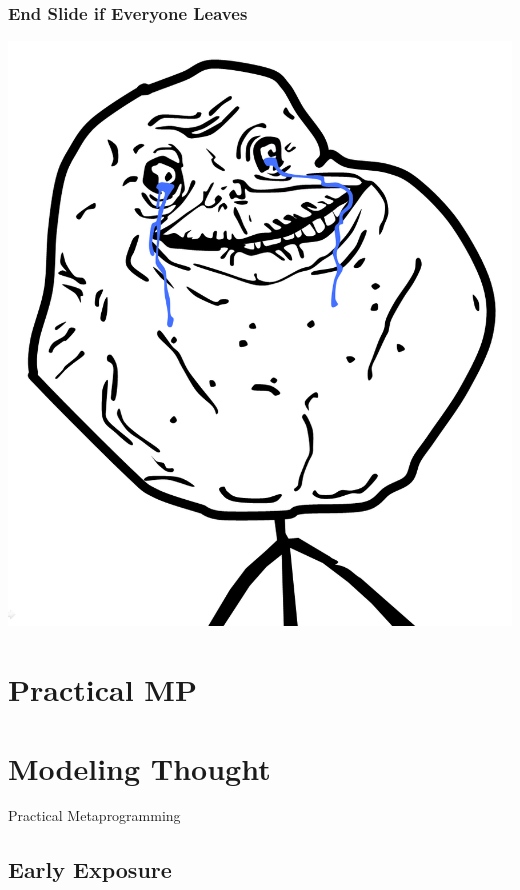 \documentclass[slidestop,compress,mathserif]{beamer}
\begin{document}
\begin{frame}
	\frametitle{End Slide if Everyone Leaves}
	\begin{center}
		\includegraphics[scale=0.25]{img/forever_alone.png}
	\end{center}
\end{frame}


\section{Practical MP} %
\label{sub:practical_metaprogramming}

\section{Modeling Thought} %
\label{sec:modeling_thought}

\begin{frame}
	\begin{center}
		Practical Metaprogramming
	\end{center}
\end{frame}

\subsection{Early Exposure} %
\label{sub:early_exposure}
\end{document}
